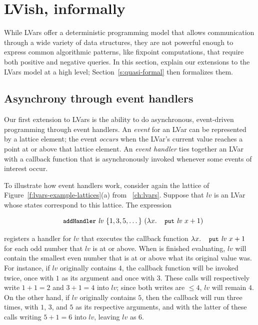 \section{LVish, informally}\label{s:quasi-informal}

\ifdefined\DISSERTATION
While LVars offer a deterministic programming model that allows
communication through a wide variety of data structures, they are not
powerful enough to express common algorithmic patterns, like fixpoint
computations, that require both positive and negative queries.
\fi
In
this section,  explain our extensions to the LVars model at a high
level; Section~\ref{s:quasi-formal} then formalizes them.

\subsection{Asynchrony through event handlers}

Our first extension to LVars is the ability to do asynchronous,
event-driven programming through event handlers.  An \emph{event} for
an LVar can be represented by a lattice element; the event
\emph{occurs} when the LVar's current value reaches a point at or
above that lattice element.  An \emph{event handler} ties together an
LVar with a callback function that is asynchronously invoked whenever
some events of interest occur.

To illustrate how event handlers work, consider again the lattice of
Figure~\ref{f:lvars-example-lattices}(a) from ~\ref{ch:lvars}.
Suppose that $\mathit{lv}$ is an LVar whose states correspond to this
lattice.  The expression

\vspace{-8mm}
\singlespacing
\begin{equation}
  \ADDHANDLER~\mathit{lv}~\{ 1, 3, 5, \dots \}~(\lam{x}{\putexp{\mathit{lv}}{x+1}})
\label{e:lvish-example-1}
\end{equation}
\doublespacing

\noindent registers a handler for $\mathit{lv}$ that executes the callback
function $\lam{x}{\putexp{\mathit{lv}}{x+1}}$ for each odd number that
$\mathit{lv}$ is at or above.  When  is
finished evaluating, $\mathit{lv}$ will contain the smallest even
number that is at or above what its original value was.  For instance,
if $\mathit{lv}$ originally contains $4$, the callback function will
be invoked twice, once with $1$ as its argument and once with $3$.
These calls will respectively write $1+1 = 2$ and $3+1 = 4$ into
$\mathit{lv}$; since both writes are $\leq 4$, $\mathit{lv}$ will
remain $4$.  On the other hand, if $\mathit{lv}$ originally contains
$5$, then the callback will run three times, with $1$, $3$, and $5$ as
its respective arguments, and with the latter of these calls writing
$5+1 = 6$ into $\mathit{lv}$, leaving $\mathit{lv}$ as $6$.

